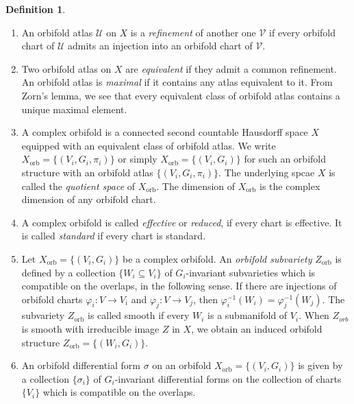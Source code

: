 \documentclass[12pt]{amsart}
\newcommand{\<}{\leq}
\theoremstyle{remark}
\theoremstyle{definition}
\newtheorem{definition}[theorem]{Definition}
\theoremstyle{definition}
\numberwithin{equation}{section}
\theoremstyle{definition}
\theoremstyle{definition}
\def\orb{\mathrm{orb}}
\begin{document}
\begin{definition}
\begin{enumerate}
    \item An  orbifold  atlas  $\mathcal{U}$ on $X$ is a \textit{refinement} of another one $\mathcal{V}$ if every orbifold chart of $\mathcal{U}$ admits an injection into an orbifold chart of $\mathcal{V}$.  

    
    \item  Two orbifold  atlas   on   $X$ are \textit{equivalent} if they admit a common refinement. 
           An orbifold atlas is \textit{maximal} if it contains any atlas equivalent to it. 
           From Zorn's lemma, we see that every equivalent class of orbifold atlas contains a unique maximal element.


    \item A complex orbifold is  a connected second countable Hausdorff space $X$ equipped with an equivalent class of orbifold atlas. 
    We write $X_{\orb} =  \{ (V_i,G_i,\pi_i) \}$ or simply $X_{\orb} = \{ (V_i,G_i) \}$ for such an orbifold structure with an orbifold atlas $\{ (V_i,G_i,\pi_i)\}$. 
    The underlying spcae $X$ is called the \textit{quotient space} of $X_{\orb}$. 
    The dimension of $X_{\orb}$ is the complex dimension of any orbifold chart. 

    \item  A complex orbifold is called \textit{effective} or \textit{reduced},    if every chart is effective. 
    It is called \textit{standard} if every chart is standard.   
           
     \item Let $X_{\orb}=\{(V_i,G_i)\}$ be a complex orbifold. 
     An \textit{orbifold subvariety} $Z_{\orb}$ is defined by a collection $\{W_i\subseteq V_i\}$ of $G_i$-invariant subvarieties  which is compatible on the overlaps, in the following sense. 
     If there are injections of orbifold charts $\varphi_i\colon V \to V_i$ and $\varphi_j\colon V\to V_j$, then $\varphi_i^{-1}(W_i) =\varphi_j^{-1}(W_j).$  
     The subvariety $Z_{\orb}$ is called smooth if every $W_i$ is a submanifold of $V_i$. 
     When $Z_{orb}$ is smooth with irreducible image $Z$ in $X$, we obtain an induced orbifold structure $Z_{\orb}=\{(W_i,G_i)\}$. 

     \item An orbifold differential form $\sigma $ on an orbifold $X_{\orb}=\{(V_i,G_i)\}$ is given by a collection $\{ \sigma_i \}$ of $G_i$-invariant differential forms on the collection of charts $\{V_i\}$  which is compatible on the overlaps. 


\end{enumerate}
\end{definition}
\end{document}
